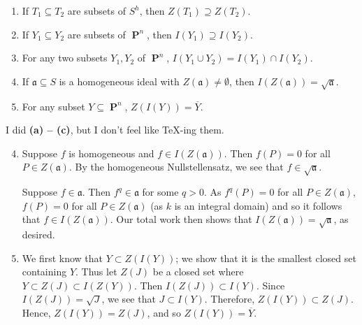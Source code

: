 \documentclass{hw_pset} %
\DeclareMathOperator{\pp}{\mathbf{P}} %
\newcommand{\idl}[1]{\mathfrak{#1}} %
\begin{document}
\begin{exercise}[Exercise 2.3]
    \begin{enumerate}
        \item If $T_1 \subseteq T_2$ are subsets of $S^h$, then $Z(T_1) \supseteq
        Z(T_2)$.
      \item If $Y_1 \subseteq Y_2$ are subsets of $\pp^n$, then $I(Y_1) \supseteq
        I(Y_2)$.
      \item For any two subsets $Y_1,Y_2$ of $\pp^n$, $I(Y_1 \cup Y_2) = I(Y_1)
        \cap I(Y_2)$.
      \item If $\mathfrak{a} \subseteq S$ is a homogeneous ideal with
        $Z(\mathfrak{a}) \ne \emptyset$, then $I(Z(\mathfrak{a})) =
        \sqrt{\mathfrak{a}}$.
      \item For any subset $Y \subseteq \pp^n$, $Z(I(Y)) = \overline{Y}$.
    \end{enumerate}
\end{exercise}

\begin{solution}
    I did {\bf (a) -- (c)}, but I don't feel like \TeX-ing them.
    \begin{enumerate}
        \setcounter{enumi}{3}
        \item Suppose $f$ is homogeneous and $f \in I(Z(\idl{a}))$. Then 
        $f(P) = 0$ for all $P \in Z(\idl{a})$. By the homogeneous Nullstellensatz, 
        we see that $f \in \sqrt{\idl{a}}$.
        
        Suppose $f \in \idl{a}$. Then $f^q \in \idl{a}$ for some $q > 0$. 
        As $f^q(P) = 0$ for all $P \in Z(\idl{a})$, $f(P) = 0$ for all 
        $P \in Z(\idl{a})$ (as $k$ is an integral domain) and so it 
        follows that $f \in I(Z(\idl{a}))$.
        Our total work then shows that $I(Z(\idl{a})) = \sqrt{\idl{a}}$, as desired.

        \item
        We first know that $Y \subset Z(I(Y))$; we show that it is the smallest closed 
        set containing $Y$. Thus
        let $Z(J)$ be a closed set where $Y \subset Z(J) \subset I(Z(Y))$. 
        Then $I(Z(J)) \subset I(Y)$. Since $I(Z(J)) = \sqrt{J}$, we see that 
        $J \subset I(Y)$. Therefore, 
        $Z(I(Y)) \subset Z(J)$. Hence, $Z(I(Y)) = Z(J)$, and so $Z(I(Y)) = \overline{Y}$.  

        
    
    \end{enumerate}
\end{solution}
\end{document}
